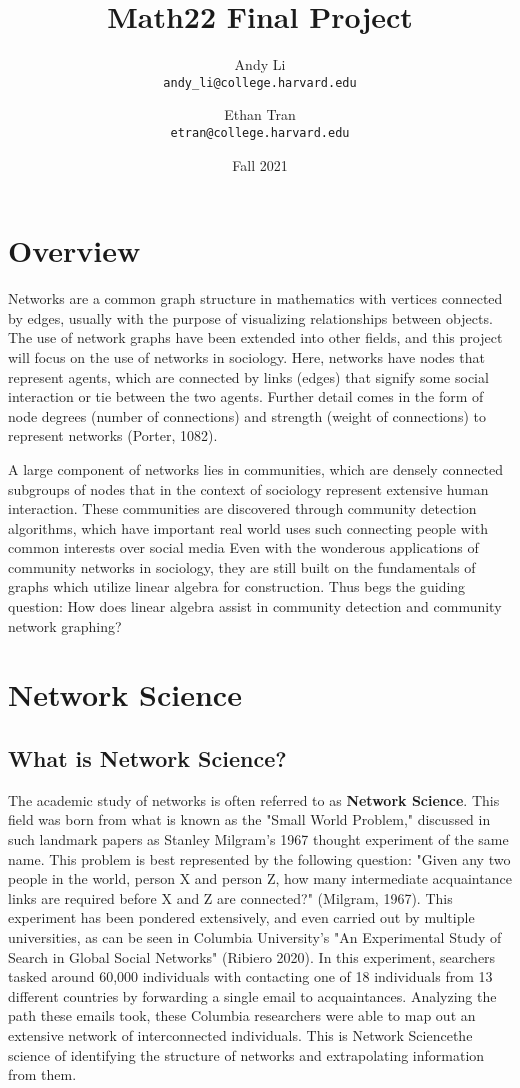 \documentclass{article}
\title{Math22 Final Project}
\date{Fall 2021}
\author{Andy Li\\ \texttt{andy\_li@college.harvard.edu} \and Ethan Tran\\ \texttt{etran@college.harvard.edu}}
\begin{document}
\maketitle

\pagebreak

\tableofcontents

\section{Overview}
Networks are a common graph structure in mathematics with vertices connected by edges, usually with the purpose of visualizing relationships between objects.
The use of network graphs have been extended into other fields, and this project will focus on the use of networks in sociology.
Here, networks have nodes that represent agents, which are connected by links (edges) that signify some social interaction or tie between the two agents.
Further detail comes in the form of node degrees (number of connections) and strength (weight of connections) to represent networks (Porter, 1082). 
 
A large component of networks lies in communities, which are densely connected subgroups of nodes that in the context of sociology represent extensive human interaction.
These communities are discovered through community detection algorithms, which have important real world uses such connecting people with common interests over social media
Even with the wonderous applications of community networks in sociology, they are still built on the fundamentals of graphs which utilize linear algebra for construction. 
Thus begs the guiding question:
How does linear algebra assist in community detection and community network graphing?

\section{Network Science}

\subsection{What is Network Science?}
The academic study of networks is often referred to as \textbf{Network Science}. This field was born from what is known as the "Small World Problem,"
discussed in such landmark papers as Stanley Milgram's 1967 thought experiment of the same name. This problem is best represented by the following question:
"Given any two people in the world, person X and person Z, how many intermediate acquaintance links are required before X and Z are connected?" (Milgram, 1967). This experiment has been
pondered extensively, and even carried out by multiple universities, as can be seen in Columbia University's "An Experimental Study of Search in Global Social Networks" (Ribiero 2020). In this experiment,
searchers tasked around 60,000 individuals with contacting one of 18 individuals from 13 different countries by forwarding a single email to acquaintances. Analyzing the path these emails took,
these Columbia researchers were able to map out an extensive network of interconnected individuals. This is Network Science\textemdash the science of identifying the structure of networks and extrapolating information
from them.
\end{document}
